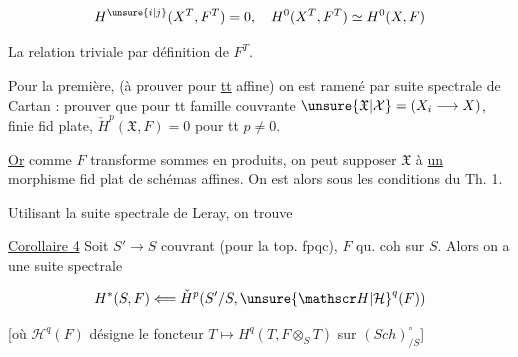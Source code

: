 
\[
H^{\unsure{i|j}}(X^T,F^T)=0,\quad H^0(X^T,F^T)\simeq H^0(X,F)
\]

 La  relation triviale par définition de $F^T$.

Pour la première,  (à prouver pour \uline{tt}  affine) on est ramené par suite spectrale de Cartan : prouver que pour tt  famille couvrante $\unsure{\mathfrak X|\mathcal X}=(X_i\longrightarrow X)$, finie fid plate, $\check H^p(\mathfrak X,F)=0$ pour tt $p\ne0$.

\uline{Or} comme $F$ transforme sommes en produits, on peut supposer $\mathfrak X$  à \uline{un} morphisme fid plat  de schémas affines. On est alors sous les conditions du Th. 1.

Utilisant la suite spectrale de Leray, on trouve

\uline{Corollaire 4} Soit $S'\longrightarrow S$ couvrant (pour la top. fpqc), $F$ qu. coh sur $S$. Alors on a une suite spectrale

\[
H^*(S,F)\Longleftarrow \check H^p(S'/S,{\unsure{\mathscr H|\mathcal H}}^q(F))
\]

[où $\mathscr H^q(F)$ désigne le foncteur $T\longmapsto H^q(T,F\otimes_S T)$ sur $(Sch)_{/S}^{\circ}$]
